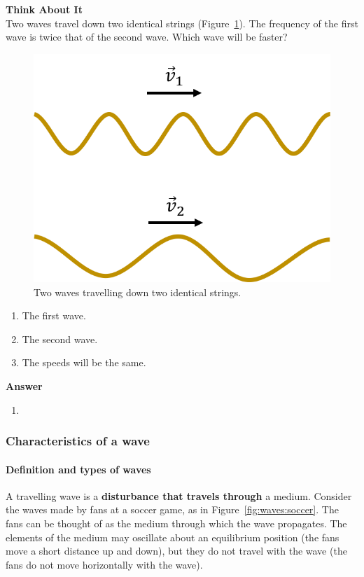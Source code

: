 \begin{framed}
\textbf{Think About It}\\
Two waves travel down two identical strings (Figure~\ref{fig:waves:opening}). The frequency of the first wave is twice that of the second wave. Which wave will be faster?

\begin{figure}[!htbp]
\centering
\includegraphics[width=0.3\linewidth]{files/wavevel-074d8cd41f9c5ee4879fb1b851f99323.png}
\caption[]{Two waves travelling down two identical strings.}
\label{fig:waves:opening}
\end{figure}

\begin{enumerate}
\item The first wave.
\item The second wave.
\item The speeds will be the same.
\end{enumerate}

\begin{framed}
\textbf{Answer}\\
\begin{enumerate}[resume]
\item
\end{enumerate}
\end{framed}
\end{framed}

\subsubsection{Characteristics of a wave}

\paragraph{Definition and types of waves}

A travelling wave is a \textbf{disturbance that travels through} a medium. Consider the waves made by fans at a soccer game, as in Figure~\ref{fig:waves:soccer}.
The fans can be thought of as the medium through which the wave propagates. The elements of the medium may oscillate about an equilibrium position (the fans move a short distance up and down), but they do not travel with the wave (the fans do not move horizontally with the wave).

